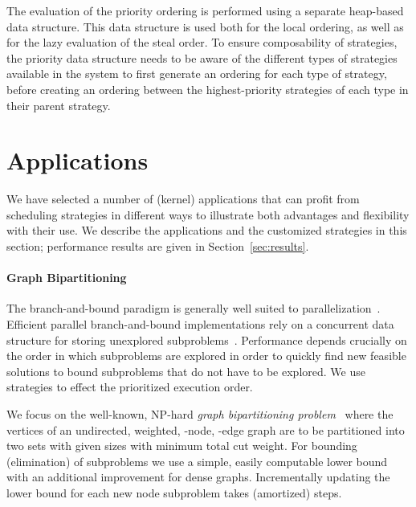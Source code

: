 \documentclass[a4paper,11pt]{article}
\begin{document}
The evaluation of the priority ordering is performed using a separate
heap-based data structure. This data structure is used both for the
local ordering, as well as for the lazy evaluation of the steal
order. To ensure composability of strategies, the priority
data structure needs to be aware of the different types of strategies
available in the system to first generate an ordering for each type of
strategy, before creating an ordering between the highest-priority
strategies of each type in their parent strategy.

\section{Applications}
\label{sec:applications}

We have selected a number of (kernel) applications that can profit
from scheduling strategies in different ways to
illustrate both advantages and flexibility with their use. We
describe the applications and the customized strategies in this
section; performance results are given in Section~\ref{sec:results}.

\paragraph{Graph Bipartitioning}
\label{sec:bb}

The branch-and-bound paradigm is generally well suited to
parallelization~\cite{CrainicLeCunRoucairol2006}.  Efficient parallel
branch-and-bound implementations rely on a concurrent data structure
for storing unexplored
subproblems~\cite{HerleyPietracaprinaPucci99,KarpZhang93,Sanders95}.
Performance depends crucially on the order in which subproblems are
explored in order to quickly find new feasible solutions to bound
subproblems that do not have to be explored.  We use strategies to
effect the prioritized execution order.

We focus on the well-known, NP-hard \emph{graph bipartitioning
  problem}~\cite{PapadimitriouSteiglitz82} where the vertices of an
undirected, weighted, -node, -edge graph are to be partitioned
into two sets with given sizes with minimum total cut weight. For
bounding (elimination) of subproblems we use a simple, easily
computable lower bound~\cite{Traff91:or} with an
additional improvement for dense graphs. Incrementally updating the
lower bound for each new node subproblem takes  (amortized) steps.
\end{document}
